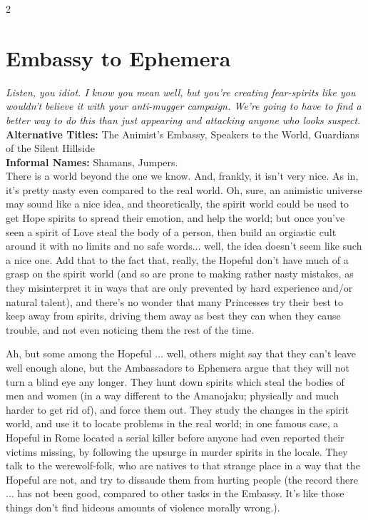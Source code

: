 \begin{multicols}{2}
\section*{Embassy to Ephemera}
\label{sec:EmbassyEphemera}

\textit{Listen, you idiot. I know you mean well, but you're creating fear-spirits like you wouldn't believe it with your anti-mugger campaign. We're going to have to find a better way to do this than just appearing and attacking anyone who looks suspect.}\\

\noindent \textbf{Alternative Titles:} The Animist's Embassy, Speakers to the World, Guardians of the Silent Hillside\\

\noindent \textbf{Informal Names:} Shamans, Jumpers. \\

\noindent There is a world beyond the one we know. And, frankly, it isn't very nice. As in, it's pretty nasty even compared to the real world. Oh, sure, an animistic universe may sound like a nice idea, and theoretically, the spirit world could be used to get Hope spirits to spread their emotion, and help the world; but once you've seen a spirit of Love steal the body of a person, then build an orgiastic cult around it with no limits and no safe words... well, the idea doesn't seem like such a nice one. Add that to the fact that, really, the Hopeful don't have much of a grasp on the spirit world (and so are prone to making rather nasty mistakes, as they misinterpret it in ways that are only prevented by hard experience and/or natural talent), and there's no wonder that many Princesses try their best to keep away from spirits, driving them away as best they can when they cause trouble, and not even noticing them the rest of the time.

Ah, but some among the Hopeful ... well, others might say that they can't leave well enough alone, but the Ambassadors to  Ephemera argue that they will not turn a blind eye any longer. They hunt down spirits which steal the bodies of men and women (in a way different to the Amanojaku; physically and much harder to get rid of), and force them out. They study the changes in the spirit world, and use it to locate problems in the real world; in one famous case, a Hopeful in Rome located a serial killer before anyone had even reported their victims missing, by following the upsurge in murder spirits in the locale. They talk to the werewolf-folk, who are natives to that strange place in a way that the Hopeful are not, and try to dissaude them from hurting people (the record there ... has not been good, compared to other tasks in the Embassy. It's like those things don't find hideous amounts of violence morally wrong.).


\end{multicols}
